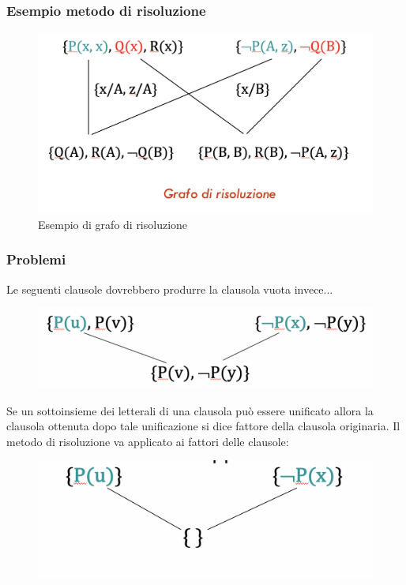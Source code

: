 \documentclass{article}
\begin{document}
\subsubsection{Esempio metodo di risoluzione}
\begin{figure}[h!]
\centering
\includegraphics[scale=0.3]{Images/FOLresexample.png}
\caption{Esempio di grafo di risoluzione}
\end{figure}
\subsubsection{Problemi}
Le seguenti clausole dovrebbero produrre la clausola vuota invece...\newline
\begin{figure}[H]
\centering
\includegraphics[scale=0.2]{Images/problem_a.png}
\end{figure}
Se un sottoinsieme dei letterali di una clausola può essere unificato allora la clausola ottenuta dopo tale unificazione si dice fattore della clausola originaria.\newline
Il metodo di risoluzione va applicato ai fattori delle clausole:
\begin{figure}[H]
\centering
\includegraphics[scale=0.2]{Images/problem_b.png}
\end{figure}
\end{document}
